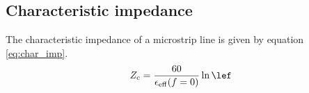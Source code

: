 \subsection{Characteristic impedance}
The characteristic impedance of a microstrip line is given by equation \ref{eq:char_imp}.
\begin{equation}
Z_{\rm c} = \frac{60}{\epsilon_{\rm eff}(f=0)} \ln \lef
\label{eq:char_imp}
\end{equation}